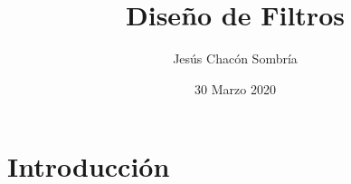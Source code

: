 \documentclass{beamer}
\title{Diseño de Filtros}
\institute{Universidad Complutense de Madrid}
\author{Jesús Chacón Sombría}
\date{30 Marzo 2020}
\begin{document}
\maketitle

\section{Introducción}


%
\end{document}
